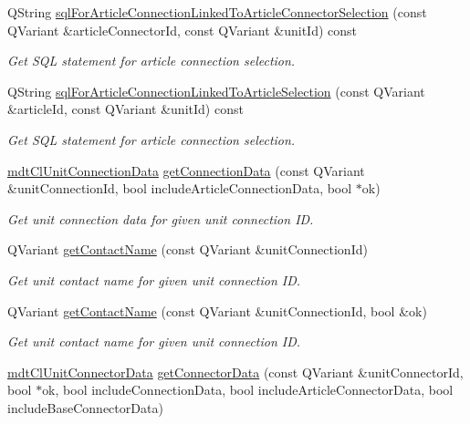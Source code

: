\begin{DoxyCompactItemize}
Q\-String \hyperlink{classmdt_cl_unit_adc3fcf6f85c715dd31700186ac775e24}{sql\-For\-Article\-Connection\-Linked\-To\-Article\-Connector\-Selection} (const Q\-Variant \&article\-Connector\-Id, const Q\-Variant \&unit\-Id) const 
\begin{DoxyCompactList}\small\item\em Get S\-Q\-L statement for article connection selection. \end{DoxyCompactList}\item 
Q\-String \hyperlink{classmdt_cl_unit_a35befd3bf556fc29f0d3d1e1aa9a69cf}{sql\-For\-Article\-Connection\-Linked\-To\-Article\-Selection} (const Q\-Variant \&article\-Id, const Q\-Variant \&unit\-Id) const 
\begin{DoxyCompactList}\small\item\em Get S\-Q\-L statement for article connection selection. \end{DoxyCompactList}\item 
\hyperlink{classmdt_cl_unit_connection_data}{mdt\-Cl\-Unit\-Connection\-Data} \hyperlink{classmdt_cl_unit_a73c87dcbb0f21a16849e5c04d35753aa}{get\-Connection\-Data} (const Q\-Variant \&unit\-Connection\-Id, bool include\-Article\-Connection\-Data, bool $\ast$ok)
\begin{DoxyCompactList}\small\item\em Get unit connection data for given unit connection I\-D. \end{DoxyCompactList}\item 
Q\-Variant \hyperlink{classmdt_cl_unit_ab14d9e9364bbfe6e1c5c238c1aefb02a}{get\-Contact\-Name} (const Q\-Variant \&unit\-Connection\-Id)
\begin{DoxyCompactList}\small\item\em Get unit contact name for given unit connection I\-D. \end{DoxyCompactList}\item 
Q\-Variant \hyperlink{classmdt_cl_unit_a640b8483ddc944484126c8f0a2a97909}{get\-Contact\-Name} (const Q\-Variant \&unit\-Connection\-Id, bool \&ok)
\begin{DoxyCompactList}\small\item\em Get unit contact name for given unit connection I\-D. \end{DoxyCompactList}\item 
\hyperlink{classmdt_cl_unit_connector_data}{mdt\-Cl\-Unit\-Connector\-Data} \hyperlink{classmdt_cl_unit_ae0992fd5a8807953ee882487c3aaa4b0}{get\-Connector\-Data} (const Q\-Variant \&unit\-Connector\-Id, bool $\ast$ok, bool include\-Connection\-Data, bool include\-Article\-Connector\-Data, bool include\-Base\-Connector\-Data)

\end{DoxyCompactItemize}
